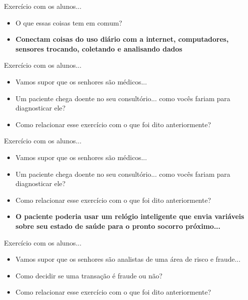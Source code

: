 \begin{frame}	
	\begin{block}{Exercício com os alunos...}
		 \begin{itemize}
			  \item O que essas coisas tem em comum?
			  \item \textbf{Conectam coisas do uso diário com a internet, computadores, sensores trocando, coletando e analisando dados}
		  \end{itemize}
	\end{block}
\end{frame}

\begin{frame}	
	\begin{block}{Exercício com os alunos...}
		 \begin{itemize}
			  \item Vamos supor que os senhores são médicos...
			  \item Um paciente chega doente no seu consultório... como vocês fariam para diagnosticar ele?
			  \item Como relacionar esse exercício com o que foi dito anteriormente?
		  \end{itemize}
	\end{block}
\end{frame}

\begin{frame}	
	\begin{block}{Exercício com os alunos...}
		 \begin{itemize}
			  \item Vamos supor que os senhores são médicos...
			  \item Um paciente chega doente no seu consultório... como vocês fariam para diagnosticar ele?
			  \item Como relacionar esse exercício com o que foi dito anteriormente?
			  \item \textbf{O paciente poderia usar um relógio inteligente que envia variáveis sobre seu estado de saúde para o pronto socorro próximo...}
		  \end{itemize}
	\end{block}
\end{frame}


\begin{frame}	
	\begin{block}{Exercício com os alunos...}
		 \begin{itemize}
			  \item Vamos supor que os senhores são analistas de uma área de risco e fraude...
			  \item Como decidir se uma transação é fraude ou não?
			  \item Como relacionar esse exercício com o que foi dito anteriormente?
		  \end{itemize}
	\end{block}
\end{frame}



